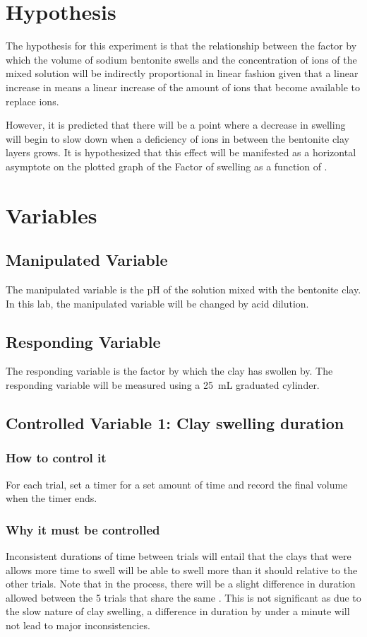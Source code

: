 \documentclass[11pt, letterpaper]{article}
\begin{document}
\section{Hypothesis}

The hypothesis for this experiment is that the relationship between
the factor by which the volume of
sodium bentonite swells and the concentration of  ions of the mixed
solution will be indirectly proportional in linear fashion
given that a linear increase in \ce{[H+]} means a linear increase
of the amount of  ions that become available to replace  ions.

However, it is predicted that there will be a point where
a decrease in swelling will begin to slow down when a deficiency
of  ions in between the bentonite clay layers grows.
It is hypothesized that this effect will be manifested
as a horizontal asymptote on the plotted graph of the Factor
of swelling as a function of \ce{[H+]}.

\section{Variables}

\subsection{Manipulated Variable}
The manipulated variable is the pH of the solution mixed with the
bentonite clay. In this lab, the manipulated variable will be
changed by acid dilution.

\subsection{Responding Variable}
The responding variable is the factor by which the clay has swollen by.
The responding variable will be measured using a \SI{25}{mL} graduated cylinder.

\subsection{Controlled Variable 1: Clay swelling duration}
\subsubsection{How to control it}
For each trial, set a timer for a set amount of time and record
the final volume when the timer ends.
\subsubsection{Why it must be controlled}
Inconsistent durations of time between trials will entail
that the clays that were allows more time to swell will be able
to swell more than it should relative to the other trials.
Note that in the process, there will be a slight difference in duration
allowed between the 5 trials that share the same \ce{[H+]}.
This is not significant as due to the slow nature of clay swelling,
a difference in duration by under a minute will not lead to
major inconsistencies.
\end{document}
